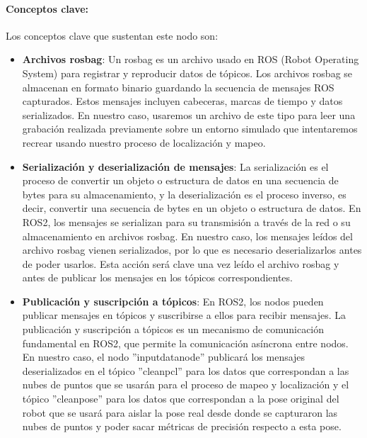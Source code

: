 \documentclass[12pt, a4paper, twoside]{article}
\begin{document}
\paragraph{Conceptos clave:}
Los conceptos clave que sustentan este nodo son:
\begin{itemize}
  \item \textbf{Archivos rosbag}: Un rosbag es un archivo usado en ROS (Robot Operating System) para registrar y reproducir datos de tópicos. Los 
  archivos rosbag se almacenan en formato binario guardando la secuencia de mensajes ROS capturados. Estos mensajes incluyen cabeceras, marcas de tiempo 
  y datos serializados. En nuestro caso, usaremos un archivo de este tipo para leer una grabación realizada previamente sobre un entorno simulado que 
  intentaremos recrear usando nuestro proceso de localización y mapeo.
  \item \textbf{Serialización y deserialización de mensajes}: La serialización es el proceso de convertir un objeto o estructura de datos en una secuencia 
  de bytes para su almacenamiento, y la deserialización es el proceso inverso, es decir, convertir una secuencia de bytes en un objeto o estructura de datos. 
  En ROS2, los mensajes se serializan para su transmisión a través de la red o su almacenamiento en archivos rosbag. En nuestro caso, los mensajes leídos del 
  archivo rosbag vienen serializados, por lo que es necesario deserializarlos antes de poder usarlos. Esta acción será clave una vez leído el archivo rosbag 
  y antes de publicar los mensajes en los tópicos correspondientes.
  \item \textbf{Publicación y suscripción a tópicos}: En ROS2, los nodos pueden publicar mensajes en tópicos y suscribirse a ellos para recibir mensajes.
  La publicación y suscripción a tópicos es un mecanismo de comunicación fundamental en ROS2, que permite la comunicación asíncrona entre nodos. En nuestro caso, 
  el nodo ''input\textunderscore data\textunderscore node'' publicará los mensajes deserializados en el tópico ''clean\textunderscore pcl'' para los datos que 
  correspondan a las nubes de puntos que se usarán para el proceso de mapeo y localización y el tópico ''clean\textunderscore pose'' para los datos que correspondan 
  a la pose original del robot que se usará para aislar la pose real desde donde se capturaron las nubes de puntos y poder sacar métricas de precisión respecto a 
  esta pose.  
\end{itemize}
\end{document}

